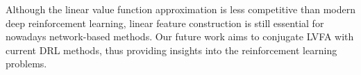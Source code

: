 \documentclass[onecolumn, conference]{IEEEtran}
\begin{document}
Although the linear value function approximation is less competitive than modern deep reinforcement learning, linear feature construction is still essential for nowadays network-based methods. Our future work aims to conjugate LVFA with current DRL methods, thus providing insights into the reinforcement learning problems.



\end{document}

